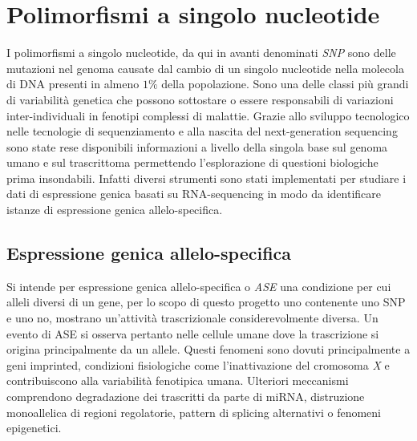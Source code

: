 \section{Polimorfismi a singolo nucleotide}
I polimorfismi a singolo nucleotide, da qui in avanti denominati \emph{SNP} sono delle mutazioni nel genoma causate dal cambio di un singolo nucleotide nella molecola di DNA presenti in almeno $1\%$ della popolazione.
Sono una delle classi pi\`u grandi di variabilit\`a genetica che possono sottostare o essere responsabili di variazioni inter-individuali in fenotipi complessi di malattie.
Grazie allo sviluppo tecnologico nelle tecnologie di sequenziamento e alla nascita del next-generation sequencing sono state rese disponibili informazioni a livello della singola base sul genoma umano e sul trascrittoma permettendo l'esplorazione di questioni biologiche prima insondabili.
Infatti diversi strumenti sono stati implementati per studiare i dati di espressione genica basati su RNA-sequencing in modo da identificare istanze di espressione genica allelo-specifica.

\subsection{Espressione genica allelo-specifica}
Si intende per espressione genica allelo-specifica o \emph{ASE} una condizione per cui alleli diversi di un gene, per lo scopo di questo progetto uno contenente uno SNP e uno no, mostrano un'attivit\`a trascrizionale considerevolmente diversa.
Un evento di ASE si osserva pertanto nelle cellule umane dove la trascrizione si origina principalmente da un allele.
Questi fenomeni sono dovuti principalmente a geni imprinted, condizioni fisiologiche come l'inattivazione del cromosoma \emph{X} e contribuiscono alla variabilit\`a fenotipica umana.
Ulteriori meccanismi comprendono degradazione dei trascritti da parte di miRNA, distruzione monoallelica di regioni regolatorie, pattern di splicing alternativi o fenomeni epigenetici.

